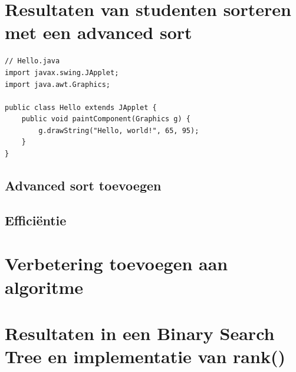 \documentclass[12pt,notitlepage]{article}
\begin{document}
\renewcommand{\contentsname}{Inhoudsopgave}
\tableofcontents
\clearpage


\section{Resultaten van studenten sorteren met een advanced sort}


\begin{lstlisting}
// Hello.java
import javax.swing.JApplet;
import java.awt.Graphics;

public class Hello extends JApplet {
    public void paintComponent(Graphics g) {
        g.drawString("Hello, world!", 65, 95);
    }
}
\end{lstlisting}


\subsection{Advanced sort toevoegen}
\subsection{Efficiëntie}

\section{Verbetering toevoegen aan algoritme}

\section{Resultaten in een Binary Search Tree en implementatie van rank()}
\end{document}
